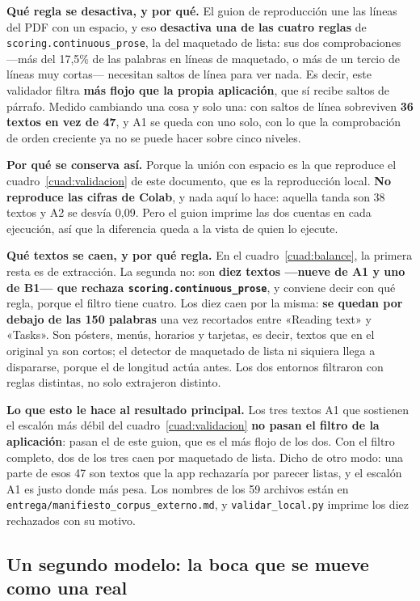 \documentclass[11pt,a4paper]{article}
\newcommand{\cod}[1]{\texttt{\small #1}}
\begin{document}
\textbf{Qué regla se desactiva, y por qué.} El guion de reproducción une las líneas del
PDF con un espacio, y eso \textbf{desactiva una de las cuatro reglas} de
\cod{scoring.continuous\_prose}, la del maquetado de lista: sus dos comprobaciones —más del
17,5\% de las palabras en líneas de maquetado, o más de un tercio de líneas muy
cortas— necesitan saltos de línea para ver nada. Es decir, este validador filtra \textbf{más flojo que la propia aplicación}, que
sí recibe saltos de párrafo. Medido cambiando una cosa y solo una: con saltos de línea
sobreviven \textbf{36 textos en vez de 47}, y A1 se queda con uno solo, con lo que la
comprobación de orden creciente ya no se puede hacer sobre cinco niveles.

\textbf{Por qué se conserva así.} Porque la unión con espacio es la que reproduce el
cuadro~\ref{cuad:validacion} de este documento, que es la reproducción local. \textbf{No
reproduce las cifras de Colab}, y nada aquí lo hace: aquella tanda son 38 textos y A2 se
desvía 0,09. Pero el guion imprime las dos cuentas en cada ejecución, así que la
diferencia queda a la vista de quien lo ejecute.

\textbf{Qué textos se caen, y por qué regla.} En el cuadro~\ref{cuad:balance}, la primera
resta es de extracción. La segunda no: son \textbf{diez textos —nueve de A1 y uno de B1—
que rechaza \cod{scoring.continuous\_prose}}, y conviene decir con qué regla, porque el
filtro tiene cuatro. Los diez caen por la misma: \textbf{se quedan por debajo de las 150
palabras} una vez recortados entre «Reading text» y «Tasks». Son pósters, menús, horarios
y tarjetas, es decir, textos que en el original ya son cortos; el detector de maquetado de
lista ni siquiera llega a dispararse, porque el de longitud actúa antes. Los dos entornos
filtraron con reglas distintas, no solo extrajeron distinto.

\textbf{Lo que esto le hace al resultado principal.} Los tres textos A1 que sostienen el
escalón más débil del cuadro~\ref{cuad:validacion} \textbf{no pasan el filtro de la
aplicación}: pasan el de este guion, que es el más flojo de los dos. Con el filtro
completo, dos de los tres caen por maquetado de lista. Dicho de otro modo: una parte de
esos 47 son textos que la app rechazaría por parecer listas, y el escalón A1 es justo
donde más pesa. Los nombres de los 59 archivos están en
\cod{entrega/manifiesto\_corpus\_externo.md}, y \cod{validar\_local.py} imprime los diez
rechazados con su motivo.

\subsection{Un segundo modelo: la boca que se mueve como una real}
\label{sec:articulatorio}
\end{document}
